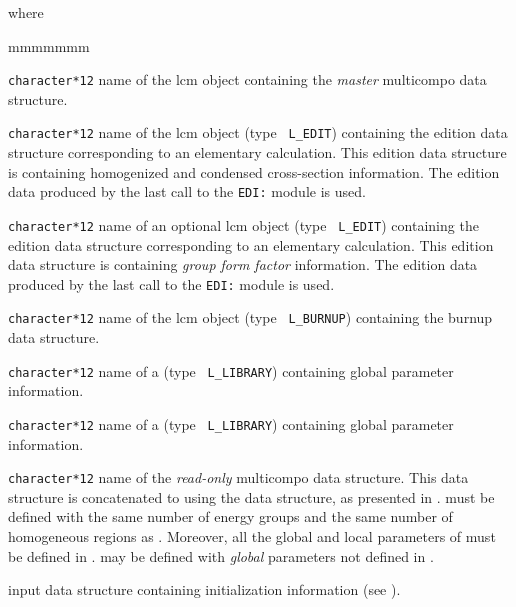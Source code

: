 \noindent where
\begin{ListeDeDescription}{mmmmmmm}

\item[\dusa{CPONAM}] {\tt character*12} name of the {\sc lcm} object containing the
{\sl master} {\sc multicompo} data structure.

\item[\dusa{EDINAM}] {\tt character*12} name of the {\sc lcm} object (type {\tt
L\_EDIT}) containing the {\sc edition} data structure corresponding to an elementary
calculation. This {\sc edition} data structure is containing homogenized and
condensed cross-section information. The {\sc edition} data produced by the last call
to the {\tt EDI:} module is used.

\item[\dusa{EDINA2}] {\tt character*12} name of an optional {\sc lcm} object (type {\tt
L\_EDIT}) containing the {\sc edition} data structure corresponding to an elementary
calculation. This {\sc edition} data structure is containing {\sl group form factor}
information. The {\sc edition} data produced by the last call to the {\tt EDI:} module
is used.

\item[\dusa{BRNNAM}] {\tt character*12} name of the {\sc lcm} object (type {\tt
L\_BURNUP}) containing the {\sc burnup} data structure.

\item[\dusa{HMIC1}] {\tt character*12} name of a  (type {\tt
L\_LIBRARY}) containing global parameter information.

\item[\dusa{HMIC2}] {\tt character*12} name of a  (type {\tt
L\_LIBRARY}) containing global parameter information.

\item[\dusa{CPORHS}] {\tt character*12} name of the {\sl read-only} {\sc multicompo} data structure. This
data structure is concatenated to  using the  data structure,
as presented in .  must be defined with the same number of energy
groups and the same number of homogeneous regions as . Moreover, all the
global and local parameters of  must be defined in . 
may be defined with {\sl global} parameters not defined in .

\item[\dusa{compo\_data1}] input data structure containing initialization information (see ).


\end{ListeDeDescription}
